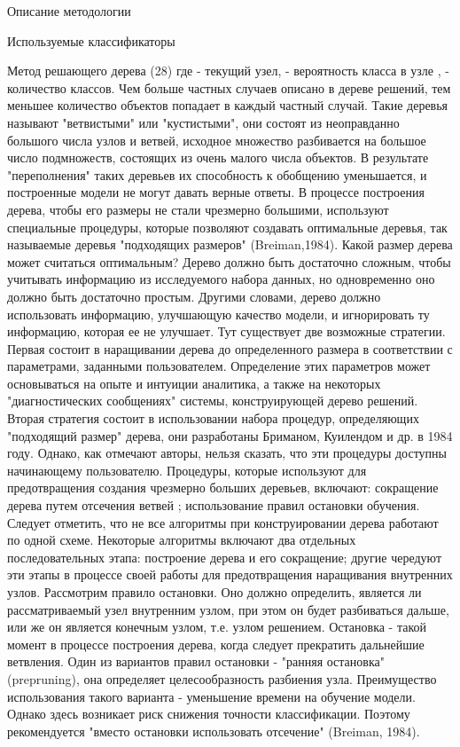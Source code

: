 \begin{section}{Описание методологии}
\begin{subsection}{Используемые классификаторы}
\begin{subsubsection}{Метод решающего дерева}
(28)
где  - текущий узел,  - вероятность класса  в узле ,  - количество классов.
Чем больше частных случаев описано в дереве решений, тем меньшее количество объектов попадает в каждый частный случай. Такие деревья называют "ветвистыми" или "кустистыми", они состоят из неоправданно большого числа узлов и ветвей, исходное множество разбивается на большое число подмножеств, состоящих из очень малого числа объектов. В результате "переполнения" таких деревьев их способность к обобщению уменьшается, и построенные модели не могут давать верные ответы.
В процессе построения дерева, чтобы его размеры не стали чрезмерно большими, используют специальные процедуры, которые позволяют создавать оптимальные деревья, так называемые деревья "подходящих размеров" (Breiman,1984).
Какой размер дерева может считаться оптимальным? Дерево должно быть достаточно сложным, чтобы учитывать информацию из исследуемого набора данных, но одновременно оно должно быть достаточно простым. Другими словами, дерево должно использовать информацию, улучшающую качество модели, и игнорировать ту информацию, которая ее не улучшает.
Тут существует две возможные стратегии. Первая состоит в наращивании дерева до определенного размера в соответствии с параметрами, заданными пользователем. Определение этих параметров может основываться на опыте и интуиции аналитика, а также на некоторых "диагностических сообщениях" системы, конструирующей дерево решений.
Вторая стратегия состоит в использовании набора процедур, определяющих "подходящий размер" дерева, они разработаны Бриманом, Куилендом и др. в 1984 году. Однако, как отмечают авторы, нельзя сказать, что эти процедуры доступны начинающему пользователю.
Процедуры, которые используют для предотвращения создания чрезмерно больших деревьев, включают: сокращение дерева путем отсечения ветвей ; использование правил остановки обучения.
Следует отметить, что не все алгоритмы при конструировании дерева работают по одной схеме. Некоторые алгоритмы включают два отдельных последовательных этапа: построение дерева и его сокращение; другие чередуют эти этапы в процессе своей работы для предотвращения наращивания внутренних узлов.
Рассмотрим правило остановки. Оно должно определить, является ли рассматриваемый узел внутренним узлом, при этом он будет разбиваться дальше, или же он является конечным узлом, т.е. узлом решением.
Остановка - такой момент в процессе построения дерева, когда следует прекратить дальнейшие ветвления.
Один из вариантов правил остановки - "ранняя остановка" (prepruning), она определяет целесообразность разбиения узла. Преимущество использования такого варианта - уменьшение времени на обучение модели. Однако здесь возникает риск снижения точности классификации. Поэтому рекомендуется "вместо остановки использовать отсечение" (Breiman, 1984).

\end{subsubsection}
\end{subsection}
\end{section}
